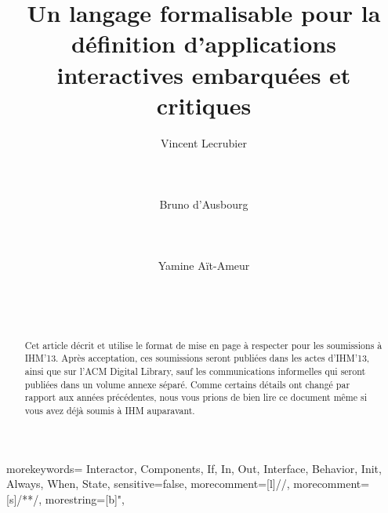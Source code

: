 \documentclass{ihm}
\begin{document}
{morekeywords={
Interactor,
Components,
If,
In,
Out,
Interface,
Behavior,
Init,
Always,
When,
State},
sensitive=false,
morecomment=[l]{//},
morecomment=[s]{/*}{*/},
morestring=[b]",
}



\title{Un langage formalisable pour la définition d'applications interactives
  embarquées et critiques}

\author{
  \alignauthor Vincent Lecrubier\\
    \\
    \\
    \\
  \alignauthor Bruno d'Ausbourg\\
    \\
    \\
    \\
  \alignauthor Yamine Aït-Ameur\\
    \\
    \\
    \\
}

\maketitle

\begin{abstract}
Cet article décrit et utilise le format de mise en page à respecter pour les
soumissions à IHM'13. Après acceptation, ces soumissions seront publiées dans
les actes d'IHM'13, ainsi que sur l'ACM Digital Library, sauf les communications
informelles qui seront publiées dans un volume annexe séparé. Comme certains
détails ont changé par rapport aux années précédentes, nous vous prions de bien
lire ce document même si vous avez déjà soumis à IHM auparavant.
\end{abstract}
\end{document}
